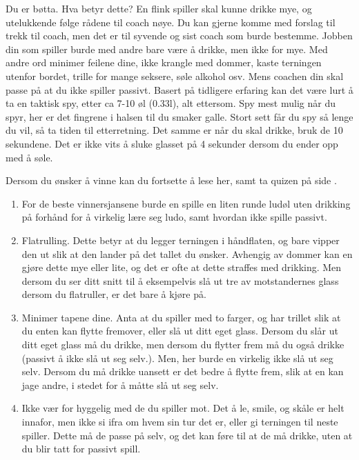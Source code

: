 \documentclass[10pt,a4paper,norsk,openany]{book}
\begin{document}
Du er bøtta. Hva betyr dette? En flink spiller skal kunne drikke mye, og
utelukkende følge rådene til coach nøye. Du kan gjerne komme med forslag til
trekk til coach, men det er til syvende og sist coach som burde bestemme. Jobben
din som spiller burde med andre bare være å drikke, men ikke for mye. Med andre
ord minimer feilene dine, ikke krangle med dommer, kaste terningen utenfor
bordet, trille for mange seksere, søle alkohol osv. Mens coachen din skal passe
på at du ikke spiller passivt. Basert på tidligere erfaring kan det være lurt å
ta en taktisk spy, etter ca 7-10 øl (0.33l), alt ettersom. Spy mest mulig når du
spyr, her er det fingrene i halsen til du smaker galle. Stort sett får du spy så
lenge du vil, så ta tiden til etterretning. Det samme er når du skal drikke,
bruk de 10 sekundene. Det er ikke vits å sluke glasset på 4 sekunder dersom du
ender opp med å søle. \medskip

\noindent
Dersom du ønsker å vinne kan du fortsette å lese her, samt ta quizen på side
\pageref{chap:quiz}.
\begin{enumerate}
    
  \item For de beste
vinnersjansene burde en spille en liten runde ludøl uten drikking på
    forhånd for å virkelig lære seg ludo, samt hvordan ikke spille passivt.
    
  \item Flatrulling. Dette betyr at du legger terningen i håndflaten, og bare
    vipper den ut slik at den lander på det tallet du ønsker. Avhengig av dommer
    kan en gjøre dette mye eller lite, og det er ofte at dette straffes med
    drikking. Men dersom du ser ditt snitt til å eksempelvis slå ut tre av
    motstandernes glass dersom du flatruller, er det bare å kjøre på.
    
  \item Minimer tapene dine. Anta at du spiller med to farger, og har trillet
    slik at du enten kan flytte fremover, eller slå ut ditt eget glass. Dersom
    du slår ut ditt eget glass må du drikke, men dersom du flytter frem må du også
    drikke (passivt å ikke slå ut seg selv.). Men, her burde en virkelig ikke slå
    ut seg selv. Dersom du må drikke uansett er det bedre å flytte frem, slik
    at en kan jage andre, i stedet for å måtte slå ut seg selv.
    
  \item Ikke vær for hyggelig med de du spiller mot. Det å le, smile, og skåle
    er helt innafor, men ikke si ifra om hvem sin tur det er, eller gi terningen
    til neste spiller. Dette må de passe på selv, og det kan føre til at de må
    drikke, uten at du blir tatt for passivt spill. 
\end{enumerate}
\end{document}
